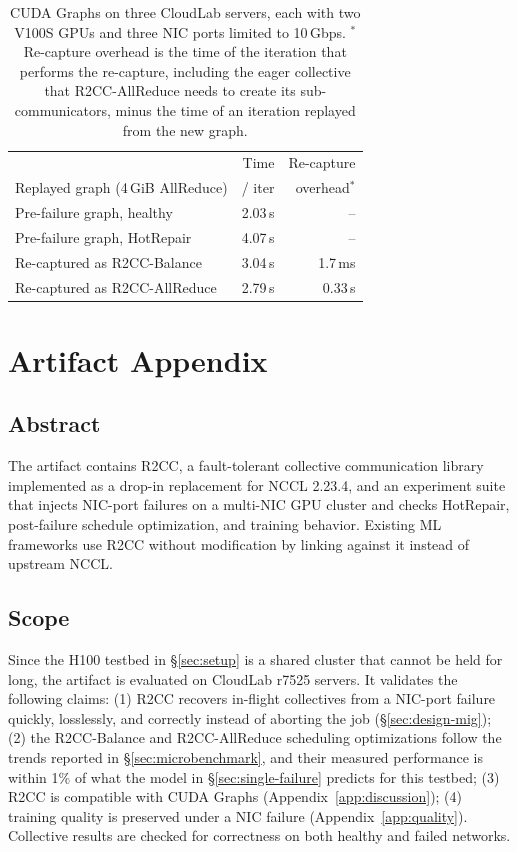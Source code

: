\documentclass[letterpaper,twocolumn,10pt]{article}
\begin{document}
\begin{table}[t]
\centering
\small
\begin{tabular}{lrr}
\toprule
 & Time & Re-capture \\
Replayed graph (4\,GiB AllReduce) & / iter & overhead$^{*}$ \\
\midrule
Pre-failure graph, healthy & 2.03\,s & -- \\
Pre-failure graph, HotRepair & 4.07\,s & -- \\
Re-captured as R2CC-Balance & 3.04\,s & 1.7\,ms \\
Re-captured as R2CC-AllReduce & 2.79\,s & 0.33\,s \\
\bottomrule
\end{tabular}
\caption{CUDA Graphs on three CloudLab servers, each with two V100S GPUs and three NIC ports limited to 10\,Gbps. $^{*}$Re-capture overhead is the time of the iteration that performs the re-capture, including the eager collective that R2CC-AllReduce needs to create its sub-communicators, minus the time of an iteration replayed from the new graph.}
\label{tab:cuda-graphs}
\end{table}




\section{Artifact Appendix}\label{app:artifact}

\subsection*{Abstract}

The artifact contains R2CC, a fault-tolerant collective communication library implemented as a drop-in replacement for NCCL 2.23.4, and an experiment suite that injects NIC-port failures on a multi-NIC GPU cluster and checks HotRepair, post-failure schedule optimization, and training behavior. Existing ML frameworks use R2CC without modification by linking against it instead of upstream NCCL.

\subsection*{Scope}

Since the H100 testbed in \S\ref{sec:setup} is a shared cluster that cannot be held for long, the artifact is evaluated on CloudLab\cite{Duplyakin+:ATC19} r7525 servers. It validates the following claims:
(1) R2CC recovers in-flight collectives from a NIC-port failure quickly, losslessly, and correctly instead of aborting the job (\S\ref{sec:design-mig});
(2) the R2CC-Balance and R2CC-AllReduce scheduling optimizations follow the trends reported in \S\ref{sec:microbenchmark}, and their measured performance is within 1\% of what the model in \S\ref{sec:single-failure} predicts for this testbed;
(3) R2CC is compatible with CUDA Graphs (Appendix~\ref{app:discussion});
(4) training quality is preserved under a NIC failure (Appendix~\ref{app:quality}).
Collective results are checked for correctness on both healthy and failed networks.
\end{document}
